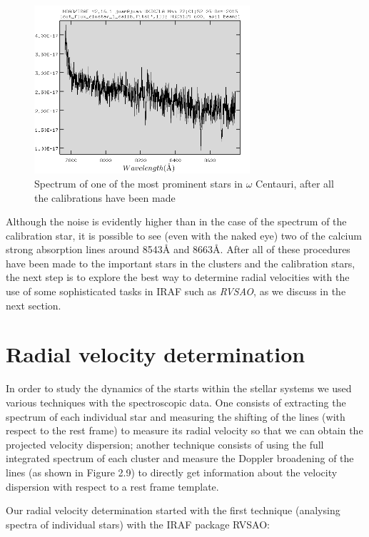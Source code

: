 \begin{figure}[H]
\centering
\includegraphics[width=8cm]{images/cluster_star_flux.png}
\caption[Spectrum of a prominent star of the NGC5139 globular cluster]{Spectrum of one of the most prominent stars in $\omega$ Centauri, after all the calibrations have been made}
\end{figure}

Although the noise is evidently higher than in the case of the spectrum of the calibration star, it is possible to see (even with the naked eye) two of the calcium strong absorption lines around 8543\AA$ $ and 8663\AA. After all of these procedures have been made to the important stars in the clusters and the calibration stars, the next step is to explore the best way to determine radial velocities with the use of some sophisticated tasks in IRAF such as \textit{RVSAO}, as we discuss in the next section. 

\section{Radial velocity determination}

In order to study the dynamics of the starts within the stellar systems we used various techniques with the spectroscopic data. One consists of extracting the spectrum of each individual star and measuring the shifting of the lines (with respect to the rest frame) to measure its radial velocity so that we can obtain the projected velocity dispersion; another technique consists of using the full integrated spectrum of each cluster and measure the Doppler broadening of the lines (as shown in Figure 2.9) to directly get information about the velocity dispersion with respect to a rest frame template. 

Our radial velocity determination started with the first technique (analysing spectra of individual stars) with the IRAF package RVSAO:

